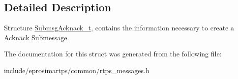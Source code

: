 \subsection{\-Detailed \-Description}
\-Structure \hyperlink{structeprosima_1_1rtps_1_1_submsg_acknack__t}{\-Submsg\-Acknack\-\_\-t}, contains the information necessary to create a \-Acknack \-Submessage. 

\-The documentation for this struct was generated from the following file\-:\begin{DoxyCompactItemize}
\item 
include/eprosimartps/common/rtps\-\_\-messages.\-h\end{DoxyCompactItemize}
